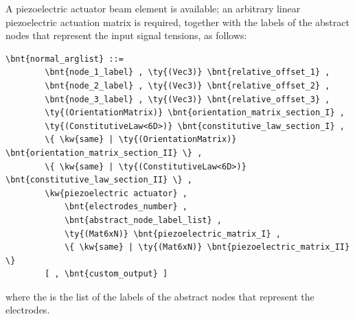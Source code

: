 A piezoelectric actuator beam element is available; an arbitrary
linear piezoelectric actuation matrix is required, together with the labels
of the abstract nodes that represent the input signal tensions, as follows:
\begin{Verbatim}[commandchars=\\\{\}]
    \bnt{normal_arglist} ::=
        \bnt{node_1_label} , \ty{(Vec3)} \bnt{relative_offset_1} ,
        \bnt{node_2_label} , \ty{(Vec3)} \bnt{relative_offset_2} ,
        \bnt{node_3_label} , \ty{(Vec3)} \bnt{relative_offset_3} ,
        \ty{(OrientationMatrix)} \bnt{orientation_matrix_section_I} ,
        \ty{(ConstitutiveLaw<6D>)} \bnt{constitutive_law_section_I} ,
        \{ \kw{same} | \ty{(OrientationMatrix)} \bnt{orientation_matrix_section_II} \} ,
        \{ \kw{same} | \ty{(ConstitutiveLaw<6D>)} \bnt{constitutive_law_section_II} \} ,
        \kw{piezoelectric actuator} , 
            \bnt{electrodes_number} ,
            \bnt{abstract_node_label_list} ,
            \ty{(Mat6xN)} \bnt{piezoelectric_matrix_I} ,
            \{ \kw{same} | \ty{(Mat6xN)} \bnt{piezoelectric_matrix_II} \}
        [ , \bnt{custom_output} ]
\end{Verbatim}
where the  is the list of the labels of the
abstract nodes that represent the electrodes.


